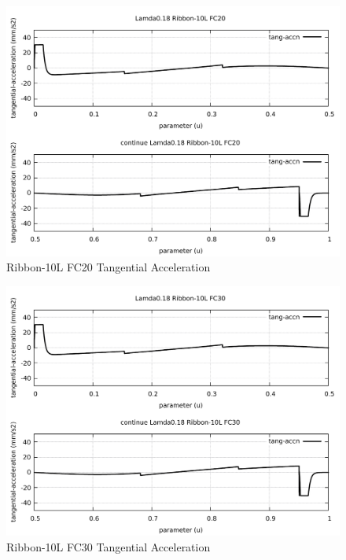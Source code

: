 \begin{figure}
	\caption     {Ribbon-10L FC20 Tangential Acceleration}
	\label{22-img-Ribbon-10L-FC20-Tangential-Acceleration.pdf}
\includegraphics[width=1.00\textwidth]{Chap4/appendix/app-Ribbon-10L/plots/22-img-Ribbon-10L-FC20-Tangential-Acceleration.pdf}
\end{figure}

\clearpage
\pagebreak

\begin{figure}
	\caption     {Ribbon-10L FC30 Tangential Acceleration}
	\label{23-img-Ribbon-10L-FC30-Tangential-Acceleration.pdf}
\includegraphics[width=1.00\textwidth]{Chap4/appendix/app-Ribbon-10L/plots/23-img-Ribbon-10L-FC30-Tangential-Acceleration.pdf}
\end{figure}


